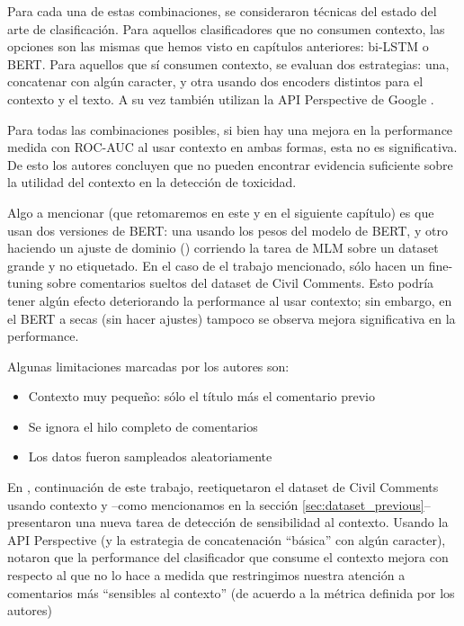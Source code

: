 Para cada una de estas combinaciones, se consideraron técnicas del estado del arte de clasificación. Para aquellos clasificadores que no consumen contexto, las opciones son las mismas que hemos visto en capítulos anteriores: bi-LSTM o BERT. Para aquellos que sí consumen contexto, se evaluan dos estrategias: una, concatenar con algún caracter, y otra usando dos encoders distintos para el contexto y el texto. A su vez también utilizan la API Perspective de Google .

Para todas las combinaciones posibles, si bien hay una mejora en la performance medida con ROC-AUC al usar contexto en ambas formas, esta no es significativa. De esto los autores concluyen que no pueden encontrar evidencia suficiente sobre la utilidad del contexto en la detección de toxicidad.

Algo a mencionar (que retomaremos en este y en el siguiente capítulo) es que usan dos versiones de BERT: una usando los pesos del modelo de BERT, y otro haciendo un ajuste de dominio () corriendo la tarea de MLM sobre un dataset grande y no etiquetado. En el caso de el trabajo mencionado, sólo hacen un fine-tuning sobre comentarios sueltos del dataset de Civil Comments. Esto podría tener algún efecto deteriorando la performance al usar contexto; sin embargo, en el BERT a secas (sin hacer ajustes) tampoco se observa mejora significativa en la performance.

Algunas limitaciones marcadas por los autores son:

\begin{itemize}
    \item Contexto muy pequeño: sólo el título más el comentario previo
    \item Se ignora el hilo completo de comentarios
    \item Los datos fueron sampleados aleatoriamente
\end{itemize}

En \citet{xenos-2021-context}, continuación de este trabajo, reetiquetaron el dataset de Civil Comments usando contexto y --como mencionamos en la sección \ref{sec:dataset_previous}-- presentaron una nueva tarea de detección de sensibilidad al contexto. Usando la API Perspective (y la estrategia de concatenación ``básica'' con algún caracter), notaron que la performance del clasificador que consume el contexto mejora con respecto al que no lo hace a medida que restringimos nuestra atención a comentarios más ``sensibles al contexto'' (de acuerdo a la métrica definida por los autores)


